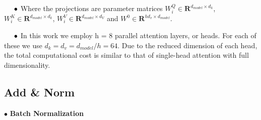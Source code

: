 \documentclass[final,letterpaper,twoside,12pt]{report}
\begin{document}
$\hspace*{0.5cm} \bullet$ Where the projections are parameter matrices $W_i^Q \in \mathbf{R}^{d_{model} \times d_k}$, $W_i^K \in \mathbf{R}^{d_{model} \times d_k}$, $W_i^V\in \mathbf{R}^{d_{model} \times d_V}$ and $W^0 \in \mathbf{R}^{hd_v\times d_{model}}$.

$\hspace*{0.5cm} \bullet$ In this work we employ h = 8 parallel attention layers, or heads. For each of these we use
$d_k = d_v = d_{model}/h = 64$. Due to the reduced dimension of each head, the total computational cost
is similar to that of single-head attention with full dimensionality.


\subsection{Add \& Norm}

$\bullet$ \textbf{Batch Normalization}
\end{document}
